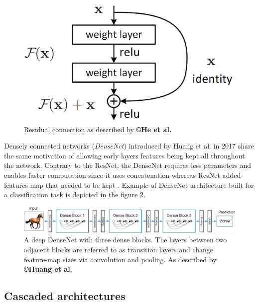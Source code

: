 \begin{figure}[th!]
	\centering
	\includegraphics[width=0.4\linewidth]{images/He2015_Fig2}
	\caption{Residual connection as described by \textbf{©He et al. \cite{He2015}}}
	\label{ResidualConnection_Fig}
\end{figure}

Densely connected networks (\emph{DenseNet}) introduced by Huang
et al. \cite{Huang2017} in 2017 share the same motivation of allowing early layers
features being kept all throughout the network. Contrary to the ResNet,
the DenseNet requires less parameters and enables faster computation
since it uses concatenation whereas ResNet added features map that
needed to be kept \cite{Huang2017}. Example of DenseNet
architecture built for a classification task is depicted in the figure \ref{DenseNet_Fig}.
\begin{figure}[th!]
	\centering
	\includegraphics[width=0.9\linewidth]{images/Huang2017_Fig2}
	\caption{A deep DenseNet with three dense blocks. The layers between two adjacent blocks are referred to as transition layers and change feature-map sizes via convolution and pooling. As described by \textbf{©Huang et al. \cite{Huang2017}}}
	\label{DenseNet_Fig}
\end{figure}


\subsection{Cascaded architectures}

